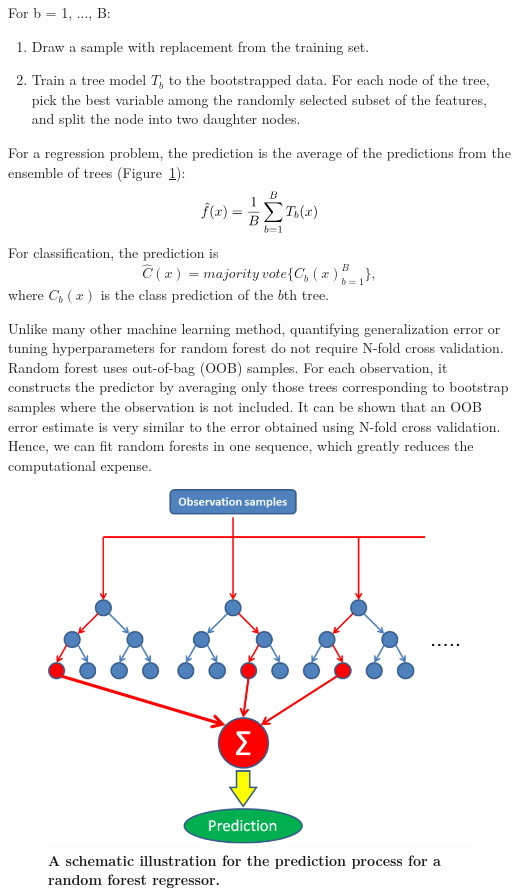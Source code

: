\documentclass{article} %
\begin{document}
For b = 1, ..., B:
\begin{enumerate}
\item Draw a sample with replacement from the training set. 
\item Train a tree model $T_b$ to the bootstrapped data. For each node of
the tree, pick the best variable among the randomly selected subset of the features, and split the node into two daughter nodes.
\end{enumerate}
For a regression problem, the prediction is the average of the predictions from the ensemble of trees (Figure~\ref{RF}):
\begin{equation}\label{eq2}
\hat{f}(x) = {1 \over B} \sum_{b=1}^{B} T_b(x) 
\end{equation}
For classification, the prediction is
\begin{equation}\label{eq3}
\hat{C}(x) = majority \ vote \{ {C_b(x)}_{b=1}^{B} \},
\end{equation}
where $C_b(x)$ is the class prediction of the $b$th tree.

Unlike many other machine learning method, quantifying generalization error or tuning hyperparameters for random forest do not require N-fold cross validation. Random forest uses out-of-bag (OOB) samples. For each observation, it constructs the predictor by averaging only those trees corresponding to bootstrap samples where the observation is not included. It can be shown that an OOB error estimate is very similar to the error obtained using N-fold cross validation. Hence, we can fit random forests in one sequence, which greatly reduces the computational expense.


\begin{figure}[ht!]
	\centering
	\includegraphics*[scale=0.25, viewport= -170mm 0mm 500mm 190mm, angle=0]{./figure/Random_forest_prediction.png}
	\caption{{\bf A schematic illustration for the prediction process for a random forest regressor.}}\label{RF} 
\end{figure}
\end{document}

